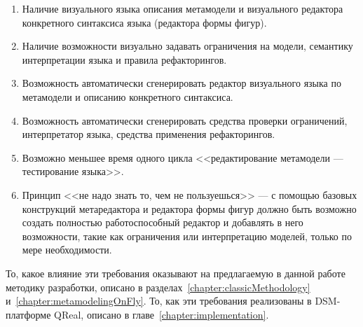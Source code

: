 \begin{enumerate}
	\item Наличие визуального языка описания метамодели и визуального редактора конкретного 
		синтаксиса языка (редактора формы фигур).
	\item Наличие возможности визуально задавать ограничения на модели, семантику интерпретации 
		языка и правила рефакторингов.
	\item Возможность автоматически сгенерировать редактор визуального языка по метамодели 
		и описанию конкретного синтаксиса.
	\item Возможность автоматически сгенерировать средства проверки ограничений, интерпретатор 
		языка, средства применения рефакторингов.
	\item Возможно меньшее время одного цикла <<редактирование метамодели --- тестирование языка>>.
	\item Принцип <<не надо знать то, чем не пользуешься>> --- с помощью базовых конструкций 
		метаредактора и редактора формы фигур должно быть возможно создать полностью работоспособный 
		редактор и добавлять в него возможности, такие как ограничения или интерпретацию моделей, 
		только по мере необходимости.
\end{enumerate}

То, какое влияние эти требования оказывают на предлагаемую в данной работе методику 
разработки, описано в разделах~\ref{chapter:classicMethodology} и~\ref{chapter:metamodelingOnFly}. 
То, как эти требования реализованы в DSM-платформе QReal, описано в главе~\ref{chapter:implementation}.

